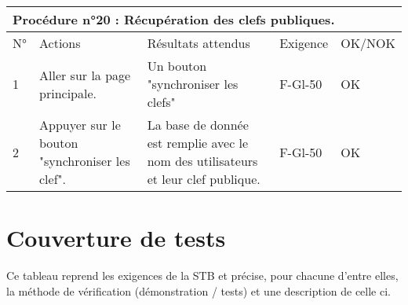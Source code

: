 \documentclass[a4paper,11pt,french]{article}
\begin{document}
\vspace{1cm}
\hspace{-1cm}
\begin{tabular}{|p{1cm}|p{5cm}|p{5cm}|p{2cm}|p{2cm}|}
\hline
\multicolumn{5}{|l|}{Procédure n°20 : Récupération des clefs publiques.} \\
\hline
N° & Actions & Résultats attendus & Exigence & OK/NOK \\
\hline
1 & Aller sur la page principale. & Un bouton "synchroniser les clefs" & F-Gl-50 & OK \\
\hline
2 & Appuyer sur le bouton "synchroniser les clef". & La base de donnée est remplie avec le nom des utilisateurs et leur clef publique. & F-Gl-50 & OK \\
\hline
\end{tabular}

\newpage

\section{Couverture de tests}
Ce tableau reprend les exigences de la STB et précise, pour chacune d’entre elles, la méthode
de vérification (démonstration / tests) et une description de celle ci.
\end{document}
